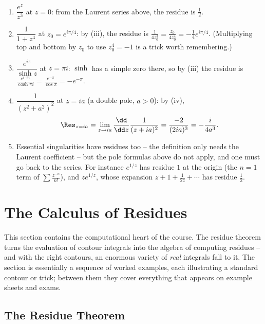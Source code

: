 \begin{example}
	\begin{enumerate}[label=(\roman*)]
		\item $\dfrac{e^z}{z^3}$ at $z = 0$: from the Laurent series above, the residue is $\frac{1}{2}$.
		\item $\dfrac{1}{1 + z^4}$ at $z_0 = e^{i\pi/4}$: by (iii), the residue is $\frac{1}{4z_0^3} = \frac{z_0}{4z_0^4} = -\frac{1}{4}e^{i\pi/4}$. (Multiplying top and bottom by $z_0$ to use $z_0^4 = -1$ is a trick worth remembering.)
		\item $\dfrac{e^{iz}}{\sinh z}$ at $z = \pi i$: $\sinh$ has a simple zero there, so by (iii) the residue is $\frac{e^{i \cdot \pi i}}{\cosh \pi i} = \frac{e^{-\pi}}{\cos \pi} = -e^{-\pi}$.
		\item $\dfrac{1}{(z^2 + a^2)^2}$ at $z = ia$ (a double pole, $a > 0$): by (iv),
		$$
		\Res_{z = ia} = \lim_{z \to ia} \frac{\dd}{\dd z} \frac{1}{(z + ia)^2} = \frac{-2}{(2ia)^3} = -\frac{i}{4a^3}.
		$$
		\item Essential singularities have residues too -- the definition only needs the Laurent coefficient -- but the pole formulas above do not apply, and one must go back to the series. For instance $e^{1/z}$ has residue $1$ at the origin (the $n = 1$ term of $\sum \frac{z^{-n}}{n!}$), and $z e^{1/z}$, whose expansion $z + 1 + \frac{1}{2z} + \cdots$ has residue $\frac 12$.
	\end{enumerate}
\end{example}

\section{The Calculus of Residues}

This section contains the computational heart of the course. The residue theorem turns the evaluation of contour integrals into the algebra of computing residues -- and with the right contours, an enormous variety of \emph{real} integrals fall to it. The section is essentially a sequence of worked examples, each illustrating a standard contour or trick; between them they cover everything that appears on example sheets and exams.

\subsection{The Residue Theorem}

